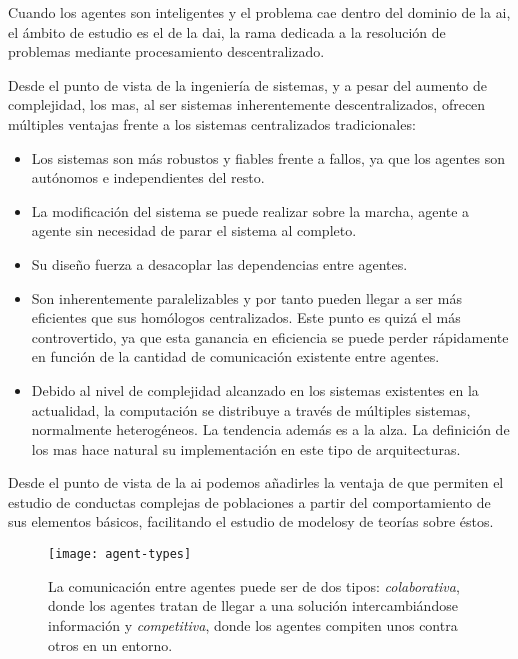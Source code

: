 Cuando los agentes son inteligentes y el problema cae dentro del dominio de la \gls{ai}, el ámbito de estudio es el de la \gls{dai}, la rama dedicada a la resolución de problemas mediante procesamiento descentralizado.

Desde el punto de vista de la ingeniería de sistemas, y a pesar del aumento de complejidad, los \gls{mas}, al ser sistemas inherentemente descentralizados, ofrecen múltiples ventajas frente a los sistemas centralizados tradicionales:

\begin{itemize}
	\item Los sistemas son más robustos y fiables frente a fallos, ya que los agentes son autónomos e independientes del resto.
	\item La modificación del sistema se puede realizar sobre la marcha, agente a agente sin necesidad de parar el sistema al completo.
	\item Su diseño fuerza a desacoplar las dependencias entre agentes.
	\item Son inherentemente paralelizables y por tanto pueden llegar a ser más eficientes que sus homólogos centralizados. Este punto es quizá el más controvertido, ya que esta ganancia en eficiencia se puede perder rápidamente en función de la cantidad de comunicación existente entre agentes.
	\item Debido al nivel de complejidad alcanzado en los sistemas existentes en la actualidad, la computación se distribuye a través de múltiples sistemas, normalmente heterogéneos. La tendencia además es a la alza. La definición de los \gls{mas} hace natural su implementación en este tipo de arquitecturas.
\end{itemize}

Desde el punto de vista de la \gls{ai} podemos añadirles la ventaja de que permiten el estudio de conductas complejas de poblaciones a partir del comportamiento de sus elementos básicos, facilitando el estudio de modelosy de teorías sobre éstos.

\begin{figure}
	\texttt{[image: agent-types]}
	\caption[Agentes colaborativos vs. competitivos]{La comunicación entre agentes puede ser de dos tipos: \textit{colaborativa}, donde los agentes tratan de llegar a una solución intercambiándose información y \textit{competitiva}, donde los agentes compiten unos contra otros en un entorno.}
	\label{fig:communication-between-agents-in-mass}
\end{figure}

